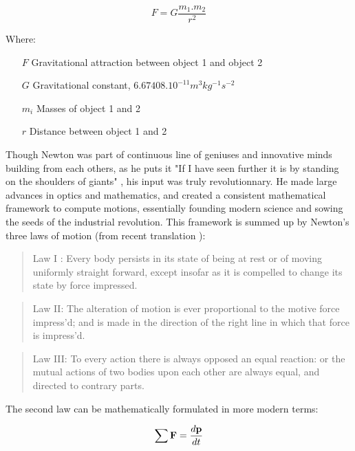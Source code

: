 \begin{equation}
F = G \frac{m_1.m_2}{r^2}
\end{equation}


Where:
\begin{itemize}[label=]
 \setlength\itemsep{-0.5em}
  \item[$F$] Gravitational attraction between object 1 and object 2
\item[$G$] Gravitational constant, $6.67408.10^{-11} m^3 kg^{-1} s^{-2}$ \citep{Pavese2015}
\item[$m_i$] Masses of object 1 and 2
\item[$r$] Distance between object 1 and 2
\end{itemize}

Though Newton was part of continuous line of geniuses and innovative minds building from each others, as he puts it "If I have seen further it is by standing on the shoulders of giants" \citep{Maury1992}, his input was truly revolutionnary. He made large advances in optics and mathematics, and created a consistent mathematical framework to compute motions, essentially founding modern science and sowing the seeds of the industrial revolution. This framework is summed up by Newton's three laws of motion (from recent translation \citealt{Cohen1999}):

\begin{quote}
Law I : Every body persists in its state of being at rest or of moving uniformly straight forward, except insofar as it is compelled to change its state by force impressed.
\end{quote}

\begin{quote}
Law II: The alteration of motion is ever proportional to the motive force impress'd; and is made in the direction of the right line in which that force is impress'd.
\end{quote}
 
 \begin{quote}
 Law III: To every action there is always opposed an equal reaction: or the mutual actions of two bodies upon each other are always equal, and directed to contrary parts.
 \end{quote}

The second law can be mathematically formulated in more modern terms:

\begin{equation}
\sum \bold{F} = \frac{d \bold{p}}{dt}
\end{equation}

